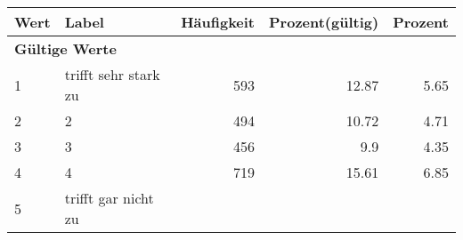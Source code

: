      \begin{longtable}{lXrrr}
     \toprule
     \textbf{Wert} & \textbf{Label} & \textbf{Häufigkeit} & \textbf{Prozent(gültig)} & \textbf{Prozent} \\
     \endhead
     \midrule
     \multicolumn{5}{l}{\textbf{Gültige Werte}}\\

     1 &
     \multicolumn{1}{X}{ trifft sehr stark zu   } &


       \num{593} &
       \num[round-mode=places,round-precision=2]{12.87} &
         \num[round-mode=places,round-precision=2]{5.65} \\

     2 &
     \multicolumn{1}{X}{ 2   } &


       \num{494} &
       \num[round-mode=places,round-precision=2]{10.72} &
         \num[round-mode=places,round-precision=2]{4.71} \\

     3 &
     \multicolumn{1}{X}{ 3   } &


       \num{456} &
       \num[round-mode=places,round-precision=2]{9.9} &
         \num[round-mode=places,round-precision=2]{4.35} \\

     4 &
     \multicolumn{1}{X}{ 4   } &


       \num{719} &
       \num[round-mode=places,round-precision=2]{15.61} &
         \num[round-mode=places,round-precision=2]{6.85} \\

     5 &
     \multicolumn{1}{X}{ trifft gar nicht zu   } &



\end{longtable}
